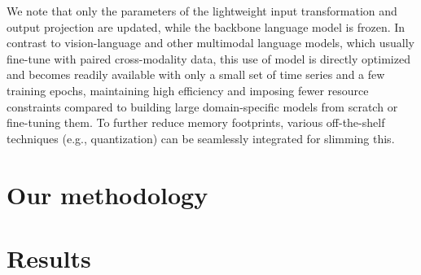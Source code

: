 We note that only the parameters of the lightweight input transformation and output projection are updated, while the backbone language model is frozen.
In contrast to vision-language and other multimodal language models, which usually fine-tune with paired cross-modality data, this use of model is directly optimized and becomes readily available with only a small set of time series and a few  training epochs, maintaining high efficiency and imposing fewer resource constraints compared to building large domain-specific models from scratch or fine-tuning them.
To further reduce memory footprints, various off-the-shelf techniques (e.g., quantization) can be seamlessly integrated for slimming this.

\section{Our methodology}
\section{Results}
